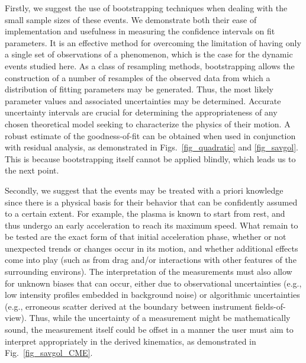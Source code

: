 \documentclass[structabstract]{aa}
\begin{document}
Firstly, we suggest the use of bootstrapping techniques when dealing with the small sample sizes of these events. We demonstrate both their ease of implementation and usefulness in measuring the confidence intervals on fit parameters. It is an effective method for overcoming the limitation of having only a single set of observations of a phenomenon, which is the case for the dynamic events studied here. As a class of resampling methods, bootstrapping allows the construction of a number of resamples of the observed data from which a distribution of fitting parameters may be generated. Thus, the most likely parameter values and associated uncertainties may be determined. Accurate uncertainty intervals are crucial for determining the appropriateness of any chosen theoretical model seeking to characterize the physics of their motion. A robust estimate of the goodness-of-fit can be obtained when used in conjunction with residual analysis, as demonstrated in Figs.~\ref{fig_quadratic} and \ref{fig_savgol}. This is because bootstrapping itself cannot be applied blindly, which leads us to the next point.

Secondly, we suggest that the events may be treated with a priori knowledge since there is a physical basis for their behavior that can be confidently assumed to a certain extent. For example, the plasma is known to start from rest, and thus undergo an early acceleration to reach its maximum speed. What remain to be tested are the exact form of that initial acceleration phase, whether or not unexpected trends or changes occur in its motion, and whether additional effects come into play (such as from drag and/or interactions with other features of the surrounding environs). The interpretation of the measurements must also allow for unknown biases that can occur, either due to observational uncertainties (e.g., low intensity profiles embedded in background noise) or algorithmic uncertainties (e.g., erroneous scatter derived at the boundary between instrument fields-of-view). Thus, while the uncertainty of a measurement might be mathematically sound, the measurement itself could be offset in a manner the user must aim to interpret appropriately in the derived kinematics, as demonstrated in Fig.~\ref{fig_savgol_CME}.
\end{document}
